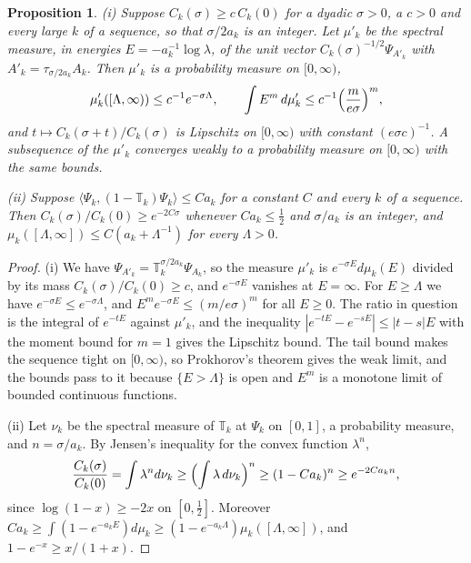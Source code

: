 \documentclass[aps,prd,twocolumn,superscriptaddress,nofootinbib,longbibliography,floatfix,amsmath,amssymb,10pt]{revtex4-2}
\newtheorem{proposition}[theorem]{Proposition}
\theoremstyle{definition}
\theoremstyle{remark}
\newcommand{\ip}[2]{\langle #1,#2\rangle}
\begin{document}
\begin{proposition}\label{prop:flowshift}
\textup{(i)} Suppose $C_k(\sigma)\ge c\,C_k(0)$ for a dyadic $\sigma>0$, a
$c>0$ and every large $k$ of a sequence, so that $\sigma/2a_k$ is an integer. Let $\mu'_k$ be the spectral measure, in
energies $E=-a_k^{-1}\log\lambda$, of the unit vector
$C_k(\sigma)^{-1/2}\Psi_{A'_k}$ with $A'_k=\tau_{\sigma/2a_k}A_k$. Then
$\mu'_k$ is a probability measure on $[0,\infty)$,
\[
\mu'_k([\Lambda,\infty))\le c^{-1}e^{-\sigma\Lambda},\qquad
\int E^m\,d\mu'_k\le c^{-1}\Bigl(\frac m{e\sigma}\Bigr)^m ,
\]
and $t\mapsto C_k(\sigma+t)/C_k(\sigma)$ is Lipschitz on $[0,\infty)$ with
constant $(e\sigma c)^{-1}$. A subsequence of the $\mu'_k$ converges weakly to
a probability measure on $[0,\infty)$ with the same bounds.

\textup{(ii)} Suppose $\ip{\Psi_k}{(1-\mathbb T_k)\Psi_k}\le Ca_k$ for a
constant $C$ and every $k$ of a sequence. Then
$C_k(\sigma)/C_k(0)\ge e^{-2C\sigma}$ whenever $Ca_k\le\frac12$ and
$\sigma/a_k$ is an integer, and $\mu_k([\Lambda,\infty])\le C(a_k+\Lambda^{-1})$
for every $\Lambda>0$.
\end{proposition}

\begin{proof}
(i) We have $\Psi_{A'_k}=\mathbb T_k^{\sigma/2a_k}\Psi_{A_k}$, so the
measure $\mu'_k$ is $e^{-\sigma E}d\mu_k(E)$ divided by its mass
$C_k(\sigma)/C_k(0)\ge c$, and $e^{-\sigma E}$ vanishes at $E=\infty$. For
$E\ge\Lambda$ we have $e^{-\sigma E}\le e^{-\sigma\Lambda}$, and
$E^me^{-\sigma E}\le(m/e\sigma)^m$ for all $E\ge0$. The ratio in question is
the integral of $e^{-tE}$ against $\mu'_k$, and the inequality
$|e^{-tE}-e^{-sE}|\le|t-s|E$ with the moment bound for $m=1$ gives the
Lipschitz bound. The tail bound makes the sequence tight on
$[0,\infty)$, so Prokhorov's theorem gives the weak limit, and the bounds pass
to it because $\{E>\Lambda\}$ is open and $E^m$ is a monotone limit of bounded
continuous functions.

(ii) Let $\nu_k$ be the spectral measure of $\mathbb T_k$ at $\Psi_k$ on
$[0,1]$, a probability measure, and $n=\sigma/a_k$. By Jensen's inequality for
the convex function $\lambda^n$,
\[
\frac{C_k(\sigma)}{C_k(0)}=\int\lambda^nd\nu_k\ge\Bigl(\int\lambda\,d\nu_k
\Bigr)^n\ge(1-Ca_k)^n\ge e^{-2Ca_kn},
\]
since $\log(1-x)\ge-2x$ on $[0,\frac12]$. Moreover $Ca_k\ge\int(1-e^{-a_kE})
d\mu_k\ge(1-e^{-a_k\Lambda})\mu_k([\Lambda,\infty])$, and
$1-e^{-x}\ge x/(1+x)$.
\end{proof}
\end{document}
